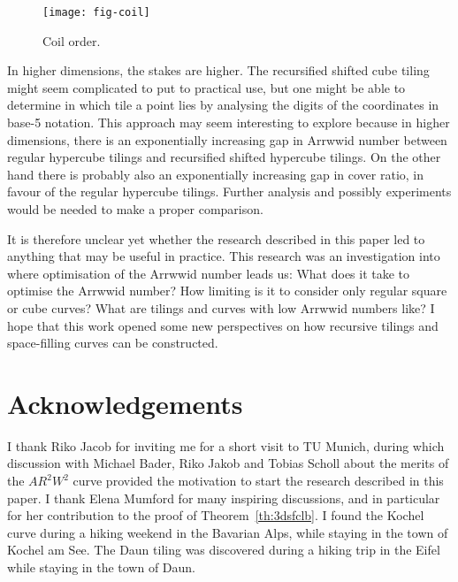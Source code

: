 \documentclass[11pt,a4paper]{article}
\newcommand{\ARRWW}{$AR^2W^2$\xspace}
\begin{document}
\begin{figure}
\centering
\texttt{[image: fig-coil]}
\caption{Coil order.}
\label{fig:coil}
\end{figure}

In higher dimensions, the stakes are higher. The recursified shifted cube tiling might seem complicated to put to practical use, but one might be able to determine in which tile a point lies by analysing the digits of the coordinates in base-5 notation. This approach may seem interesting to explore because in higher dimensions, there is an exponentially increasing gap in Arrwwid number between regular hypercube tilings and recursified shifted hypercube tilings. On the other hand there is probably also an exponentially increasing gap in cover ratio, in favour of the regular hypercube tilings. Further analysis and possibly experiments would be needed to make a proper comparison.

It is therefore unclear yet whether the research described in this paper led to anything that may be useful in practice. This research was an investigation into where optimisation of the Arrwwid number leads us: What does it take to optimise the Arrwwid number? How limiting is it to consider only regular square or cube curves? What are tilings and curves with low Arrwwid numbers like? I hope that this work opened some new perspectives on how recursive tilings and space-filling curves can be constructed.

\section*{Acknowledgements}
I thank Riko Jacob for inviting me for a short visit to TU Munich, during which discussion with Michael Bader, Riko Jakob and Tobias Scholl about the merits of the \ARRWW curve provided the motivation to start the research described in this paper. I thank Elena Mumford for many inspiring discussions, and in particular for her contribution to the proof of Theorem~\ref{th:3dsfclb}. I found the Kochel curve during a hiking weekend in the Bavarian Alps, while staying in the town of Kochel am See. The Daun tiling was discovered during a hiking trip in the Eifel while staying in the town of Daun.


\end{document}
